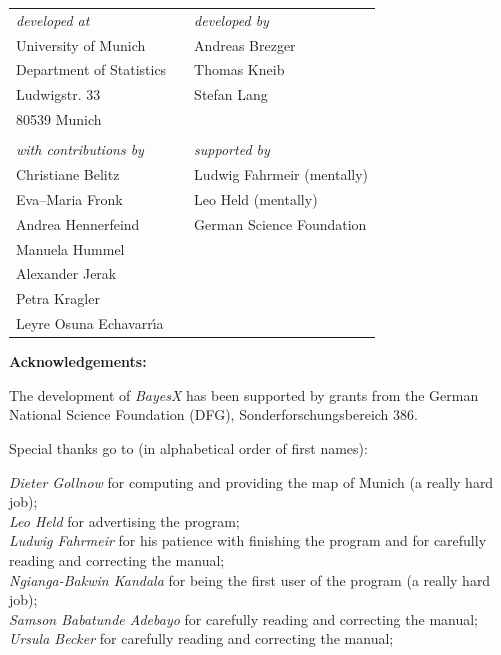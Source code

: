 \begin{table}[ht]
\begin{center}
\begin{tabular}{lll}
{\em developed at} & \hspace{1.5cm} & {\em developed by} \\
University of Munich & \hspace{1.5cm} & Andreas Brezger \\
Department of Statistics & \hspace{1.5cm} & Thomas Kneib \\
Ludwigstr. 33 & \hspace{1.5cm} & Stefan Lang \\
80539 Munich & \hspace{1.5cm} & \\
  & & \\
{\em with contributions by}  &  \hspace{1.5cm} &  {\em supported by} \\
Christiane Belitz&  \hspace{1.5cm} & Ludwig Fahrmeir (mentally) \\
Eva--Maria Fronk  & \hspace{1.5cm} & Leo Held (mentally) \\
Andrea Hennerfeind & \hspace{1.5cm} & German Science Foundation  \\
Manuela Hummel & \\
Alexander Jerak & \\
Petra Kragler & \\
Leyre Osuna Echavarr\'{\i}a& \\
\end{tabular}
\end{center}
\end{table}


\newpage

{\bf Acknowledgements:}

The development of {\em BayesX} has been supported by grants from
the German National Science Foundation (DFG),
Sonderforschungsbereich 386.

Special thanks go to (in alphabetical order of first names):

{\em Dieter Gollnow} for computing and providing the map of Munich (a really hard job); \\
{\em Leo Held} for advertising the program; \\
{\em Ludwig Fahrmeir} for his patience with finishing the program
and for carefully
reading and correcting the  manual; \\
{\em Ngianga-Bakwin Kandala} for being the first user of the program (a really hard job); \\
{\em Samson Babatunde Adebayo} for carefully reading and correcting the manual; \\
{\em Ursula Becker} for carefully reading and correcting the
manual;


